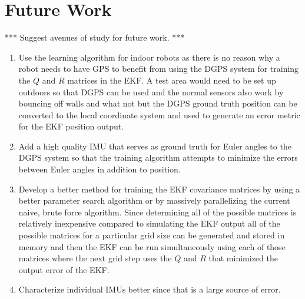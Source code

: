 \chapter{Future Work}
\label{ch:futurework}
*** Suggest avenues of study for future work. ***

\begin{enumerate}
\item Use the learning algorithm for indoor robots as there is no reason why a robot needs to have GPS to benefit from using the DGPS system for training the $Q$ and $R$ matrices in the EKF. A test area would need to be set up outdoors so that DGPS can be used and the normal sensors also work by bouncing off walls and what not but the DGPS ground truth position can be converted to the local coordinate system and used to generate an error metric for the EKF position output.
\item Add a high quality IMU that serves as ground truth for Euler angles to the DGPS system so that the training algorithm attempts to minimize the errors between Euler angles in addition to position.
\item Develop a better method for training the EKF covariance matrices by using a better parameter search algorithm or by massively parallelizing the current naive, brute force algorithm. Since determining all of the possible matrices is relatively inexpensive compared to simulating the EKF output all of the possible matrices for a particular grid size can be generated and stored in memory and then the EKF can be run simultaneously using each of those matrices where the next grid step uses the $Q$ and $R$ that minimized the output error of the EKF.
\item Characterize individual IMUs better since that is a large source of error.
\end{enumerate}
